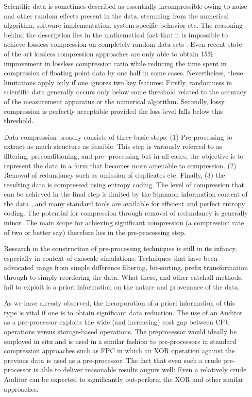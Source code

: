 Scientific data is sometimes described as essentially incompressible owing to
noise and other random effects present in the data, stemming from the numerical
algorithm, software implementation, system specific behavior etc. The reasoning
behind the description lies in the mathematical fact that it is impossible to
achieve lossless compression on completely random data sets \cite{Gray:book}. Even
recent state of the art lossless compression approaches \cite{GomezCappello} are only
able to obtain 15\% improvement in lossless compression ratio while reducing
the time spent in compression of floating point data by one half in some cases.
Nevertheless, these limitations apply only if one ignores two key features:
Firstly, randomness in scientific data generally occurs only below some
threshold related to the accuracy of the measurement apparatus or the numerical
algorithm. Secondly, lossy compression is perfectly acceptable provided the
loss level falls below this threshold.

Data compression broadly consists of three basic steps: (1) Pre-processing to
extract as much structure as feasible. This step is variously referred to as
filtering, preconditioning, and pre- processing but in all cases, the objective
is to represent the data in a form that becomes more amenable to compression.
(2) Removal of redundancy such as omission of duplicates etc.  Finally, (3) the
resulting data is compressed using entropy coding. The level of compression
that can be achieved in the final step is limited by the Shannon information
content of the data \cite{Gray:book}, and many standard tools are available for
efficient and perfect entropy coding. The potential for compression through
removal of redundancy is generally minor. The main scope for achieving
significant compression (a compression rate of two or better say) therefore
lies in the pre-processing step.

Research in the construction of pre-processing techniques is still in its
infancy, especially in context of exascale simulations. Techniques that have
been advocated range from simple difference filtering, bit-sorting, prefix
transformation through to simply reordering the data.  What these, and other
catchall methods, fail to exploit is a priori information on the nature and
provenance of the data.

As we have already observed, the incorporation of a priori information of this
type is vital if one is to obtain significant data reduction. The use of an
Auditor as a pre-processor exploits the wide (and increasing) cost gap between
CPU operations versus storage-based operations. The preprocessor would ideally
be employed in situ and is used in a similar fashion to pre-processors in
standard compression approaches such as FPC \cite{BurtscherFPC} in which an XOR
operation against the previous data is used as a pre-processor. The fact that
even such a crude pre- processor is able to deliver reasonable results augurs
well: Even a relatively crude Auditor can be expected to significantly
out-perform the XOR and other similar approaches.





